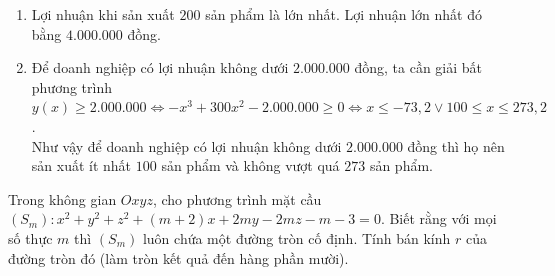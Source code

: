 \begin{ex}
{\begin{enumerate}
			\item Lợi nhuận khi sản xuất $200$ sản phẩm là lớn nhất. Lợi nhuận lớn nhất đó bằng $4.000.000$ đồng.
			\item Để doanh nghiệp có lợi nhuận không dưới $2.000.000$ đồng, ta cần giải bất phương trình
			$y(x)\geq 2.000.000 \Leftrightarrow -x^3 + 300x^2 - 2.000.000 \geq 0 \Leftrightarrow x \leq -73{,}2 \vee 100\leq x \leq 273{,}2$.\\
			Như vậy để doanh nghiệp có lợi nhuận không dưới $2.000.000$ đồng thì họ nên sản xuất ít nhất $100$ sản phẩm và không vượt quá $273$ sản phẩm.
		\end{enumerate}
	}
\end{ex}

\begin{ex}
	Trong không gian $Oxyz$, cho phương trình mặt cầu $(S_m)\colon x^2+y^2+z^2+(m+2) x+2m y-2m z-m-3=0$. Biết rằng với mọi số thực $m$ thì $(S_m)$ luôn chứa một đường tròn cố định. Tính bán kính $r$ của đường tròn đó (làm tròn kết quả đến hàng phần mười).
\end{ex}


